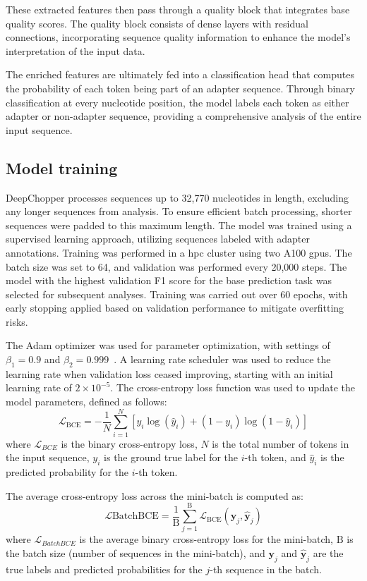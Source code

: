 \documentclass[pdflatex,sn-nature, lineno]{sn-jnl}%
\begin{document}
These extracted features then pass through a quality block that integrates base quality scores.
The quality block consists of dense layers with residual connections, incorporating sequence quality information to enhance the model's interpretation of the input data.

The enriched features are ultimately fed into a classification head that computes the probability of each token being part of an adapter sequence.
Through binary classification at every nucleotide position, the model labels each token as either adapter or non-adapter sequence, providing a comprehensive analysis of the entire input sequence.


\subsection{Model training}\label{ssec:training}

DeepChopper processes sequences up to 32,770 nucleotides in length, excluding any longer sequences from analysis.
To ensure efficient batch processing, shorter sequences were padded to this maximum length.
The model was trained using a supervised learning approach, utilizing sequences labeled with adapter annotations.
Training was performed in a \gls{hpc} cluster using two A100 \glspl{gpu}.
The batch size was set to 64, and validation was performed every 20,000 steps.
The model with the highest validation F1 score for the base prediction task was selected for subsequent analyses.
Training was carried out over \num{60} epochs, with early stopping applied based on validation performance to mitigate overfitting risks.

The Adam optimizer was used for parameter optimization, with settings of \( \beta_{1} = 0.9 \) and \( \beta_{2} = 0.999 \)~\cite{kingma2014adam}.
A learning rate scheduler was used to reduce the learning rate when validation loss ceased improving, starting with an initial learning rate of \( 2 \times 10^{-5} \).
The cross-entropy loss function was used to update the model parameters, defined as follows:
\[
	\mathcal{L}_{\textrm{BCE}} = -\frac{1}{N} \sum_{i=1}^{N} [y_i \log(\hat{y}_i) + (1 - y_i) \log(1 - \hat{y}_i)]
\]
where \(\mathcal{L}_{BCE}\) is the binary cross-entropy loss, \(N\) is the total number of tokens in the input sequence, \(y_i\) is the ground true label for the \(i\)-th token, and \(\hat{y}_i\) is the predicted probability for the \(i\)-th token.

The average cross-entropy loss across the mini-batch is computed as:
\[
	\mathcal{L}{\textrm{BatchBCE}} = \frac{1}{\textrm{B}} \sum_{j=1}^{\textrm{B}} \mathcal{L}_{\textrm{BCE}}(\mathbf{y}_j, \hat{\mathbf{y}}_j)
\]
where \(\mathcal{L}_{BatchBCE}\) is the average binary cross-entropy loss for the mini-batch, \(\textrm{B}\) is the batch size (number of sequences in the mini-batch),  and \(\mathbf{y}_j\) and \(\hat{\mathbf{y}}_j\) are the true labels and predicted probabilities for the \(j\)-th sequence in the batch.
\end{document}
